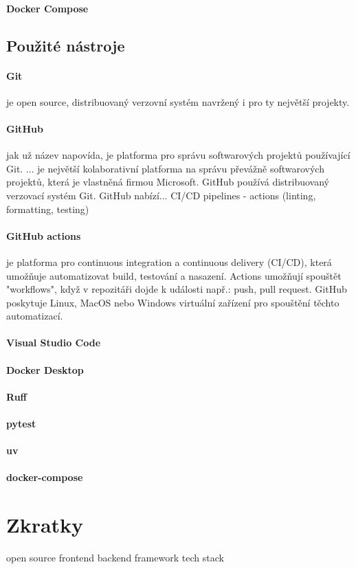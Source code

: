 \documentclass[12pt, a4paper]{article}
\begin{document}
\paragraph{Docker Compose}
\subsection{Použité nástroje}
\paragraph{Git}
je open source, distribuovaný verzovní systém navržený i pro ty největší projekty.
\paragraph{GitHub}
jak už název napovída, je platforma pro správu softwarových projektů používající Git.  ... je největší kolaborativní platforma na správu převážně softwarových projektů, která je vlastněná firmou Microsoft. GitHub používá distribuovaný verzovací systém Git. GitHub nabízí... CI/CD pipelines - actions (linting, formatting, testing)
\paragraph{GitHub actions}je platforma pro continuous integration a continuous delivery (CI/CD), která umožňuje automatizovat build, testování a nasazení. Actions umožňují spouštět "workflows", když v repozitáři dojde k události např.: push, pull request. GitHub poskytuje Linux, MacOS nebo Windows virtuální zařízení pro spouštění těchto automatizací.
\paragraph{Visual Studio Code}
\paragraph{Docker Desktop}
\paragraph{Ruff}
\paragraph{pytest}
\paragraph{uv}
\paragraph{docker-compose}
\section{Zkratky}
open source
frontend
backend
framework
tech stack
\clearpage
\clearpage
\printbibliography
\end{document}
